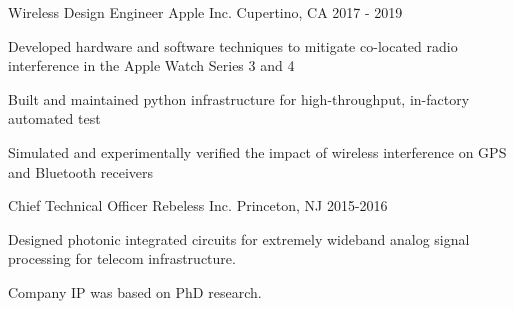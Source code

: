 \begin{cventries}
  \cventry
    {Wireless Design Engineer} %
    {Apple Inc. }
    {Cupertino, CA} %
    {2017 - 2019} %
    {
      \begin{cvitems} %
        \item {Developed hardware and software techniques to mitigate co-located radio interference in the Apple Watch Series 3 and 4}
        \item {Built and maintained python infrastructure for high-throughput, in-factory automated test}
        \item {Simulated and experimentally verified the impact of wireless interference on GPS and Bluetooth receivers}
      \end{cvitems}
    }
    
  \cventry
    {Chief Technical Officer} %
    {Rebeless Inc.}
    {Princeton, NJ} %
    {2015-2016} %
    {
      \begin{cvitems} %
        \item {Designed photonic integrated circuits for extremely wideband analog signal processing for telecom infrastructure.}
        \item {Company IP was based on PhD research.}
      \end{cvitems}
    }

\end{cventries}
